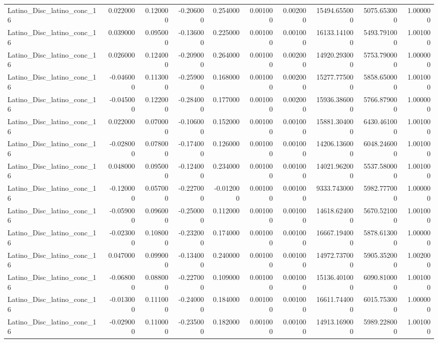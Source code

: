 \begin{table}
\begin{tabular}{lrrrrrrrrr}
Latino_Disc_latino_conc_16 & 0.022000 & 0.120000 & -0.206000 & 0.254000 & 0.001000 & 0.002000 & 15494.655000 & 5075.653000 & 1.000000 \\
Latino_Disc_latino_conc_16 & 0.039000 & 0.095000 & -0.136000 & 0.225000 & 0.001000 & 0.001000 & 16133.141000 & 5493.791000 & 1.001000 \\
Latino_Disc_latino_conc_16 & 0.026000 & 0.124000 & -0.209000 & 0.264000 & 0.001000 & 0.002000 & 14920.293000 & 5753.790000 & 1.000000 \\
Latino_Disc_latino_conc_16 & -0.046000 & 0.113000 & -0.259000 & 0.168000 & 0.001000 & 0.002000 & 15277.775000 & 5858.650000 & 1.001000 \\
Latino_Disc_latino_conc_16 & -0.045000 & 0.122000 & -0.284000 & 0.177000 & 0.001000 & 0.002000 & 15936.386000 & 5766.879000 & 1.000000 \\
Latino_Disc_latino_conc_16 & 0.022000 & 0.070000 & -0.106000 & 0.152000 & 0.001000 & 0.001000 & 15881.304000 & 6430.461000 & 1.001000 \\
Latino_Disc_latino_conc_16 & -0.028000 & 0.078000 & -0.174000 & 0.126000 & 0.001000 & 0.001000 & 14206.136000 & 6048.246000 & 1.001000 \\
Latino_Disc_latino_conc_16 & 0.048000 & 0.095000 & -0.124000 & 0.234000 & 0.001000 & 0.001000 & 14021.962000 & 5537.580000 & 1.001000 \\
Latino_Disc_latino_conc_16 & -0.120000 & 0.057000 & -0.227000 & -0.012000 & 0.001000 & 0.001000 & 9333.743000 & 5982.777000 & 1.000000 \\
Latino_Disc_latino_conc_16 & -0.059000 & 0.096000 & -0.250000 & 0.112000 & 0.001000 & 0.001000 & 14618.624000 & 5670.521000 & 1.001000 \\
Latino_Disc_latino_conc_16 & -0.023000 & 0.108000 & -0.232000 & 0.174000 & 0.001000 & 0.001000 & 16667.194000 & 5878.613000 & 1.000000 \\
Latino_Disc_latino_conc_16 & 0.047000 & 0.099000 & -0.134000 & 0.240000 & 0.001000 & 0.001000 & 14972.737000 & 5905.352000 & 1.002000 \\
Latino_Disc_latino_conc_16 & -0.068000 & 0.088000 & -0.227000 & 0.109000 & 0.001000 & 0.001000 & 15136.401000 & 6090.810000 & 1.001000 \\
Latino_Disc_latino_conc_16 & -0.013000 & 0.111000 & -0.240000 & 0.184000 & 0.001000 & 0.001000 & 16611.744000 & 6015.753000 & 1.000000 \\
Latino_Disc_latino_conc_16 & -0.029000 & 0.110000 & -0.235000 & 0.182000 & 0.001000 & 0.001000 & 14913.169000 & 5989.228000 & 1.001000 \\

\end{tabular}
\end{table}
